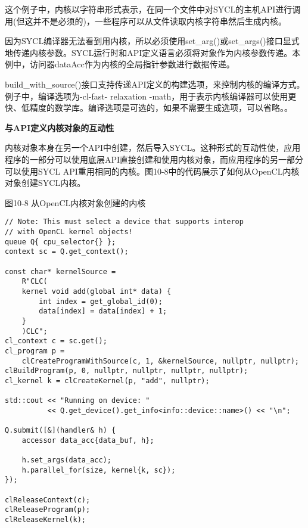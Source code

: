 这个例子中，内核以字符串形式表示，在同一个文件中对SYCL的主机API进行调用(但这并不是必须的)，一些程序可以从文件读取内核字符串然后生成内核。\par

因为SYCL编译器无法看到用内核，所以必须使用set\_arg()或set\_args()接口显式地传递内核参数。SYCL运行时和API定义语言必须将对象作为内核参数传递。本例中，访问器dataAcc作为内核的全局指针参数进行数据传递。\par

build\_with\_source()接口支持传递API定义的构建选项，来控制内核的编译方式。例子中，编译选项为-cl-fast- relaxation -math，用于表示内核编译器可以使用更快、低精度的数学库。编译选项是可选的，如果不需要生成选项，可以省略。。\par

\hspace*{\fill} \par %
\textbf{与API定义内核对象的互动性}

内核对象本身在另一个API中创建，然后导入SYCL。这种形式的互动性使，应用程序的一部分可以使用底层API直接创建和使用内核对象，而应用程序的另一部分可以使用SYCL API重用相同的内核。图10-8中的代码展示了如何从OpenCL内核对象创建SYCL内核。\par

\hspace*{\fill} \par %
图10-8 从OpenCL内核对象创建的内核
\begin{lstlisting}[caption={}]
// Note: This must select a device that supports interop 
// with OpenCL kernel objects!
queue Q{ cpu_selector{} };
context sc = Q.get_context();

const char* kernelSource =
	R"CLC(
	kernel void add(global int* data) {
		int index = get_global_id(0);
		data[index] = data[index] + 1;
	}
	)CLC";
cl_context c = sc.get();
cl_program p =
	clCreateProgramWithSource(c, 1, &kernelSource, nullptr, nullptr);
clBuildProgram(p, 0, nullptr, nullptr, nullptr, nullptr);
cl_kernel k = clCreateKernel(p, "add", nullptr);

std::cout << "Running on device: "
	 	  << Q.get_device().get_info<info::device::name>() << "\n";
	 	  
Q.submit([&](handler& h) {
	accessor data_acc{data_buf, h};
	
	h.set_args(data_acc);
	h.parallel_for(size, kernel{k, sc});
});

clReleaseContext(c);
clReleaseProgram(p);
clReleaseKernel(k);
\end{lstlisting}

